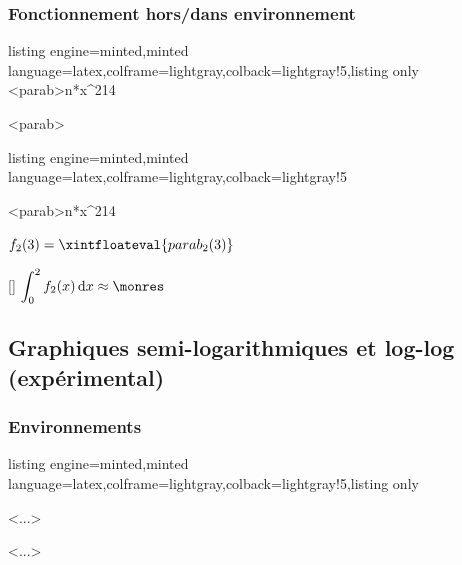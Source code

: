 \documentclass[11pt,a4paper]{ltxdoc}
\begin{document}
\subsubsection{Fonctionnement hors/dans environnement}

\begin{tcblisting}{listing engine=minted,minted language=latex,colframe=lightgray,colback=lightgray!5,listing only}
\GenererFamilleFonctions<parab>{n*x^2}{1}{4}

\TracerFamilleCourbes[clés]<parab>
\end{tcblisting}

\begin{tcblisting}{listing engine=minted,minted language=latex,colframe=lightgray,colback=lightgray!5}
\begin{GraphiqueTikz}[x=1.5cm,y=0.75cm,Xmin=-3,Xmax=3,Ymin=-1,Ymax=10]
  \DefinirFamilleCourbes[Trace,Couleurs={blue,red,green,orange},DefGlobale]%
    <parab>{n*x^2}{1}{4}
\end{GraphiqueTikz}

$f_2(3) = \xintfloateval{parab_2(3)}$

[\monres]
$\displaystyle\int_0^2 f_2(x)\,\text{d}x \approx \monres$
\end{tcblisting}

\pagebreak

\subsection{Graphiques semi-logarithmiques et log-log (expérimental)}\label{loglog}

\subsubsection{Environnements}

\begin{tcblisting}{listing engine=minted,minted language=latex,colframe=lightgray,colback=lightgray!5,listing only}
\begin{GraphiqueTikzSemiLog}[...]<...>
\end{GraphiqueTikzSemiLog}

\begin{GraphiqueTikzLogLog}[...]<...>
  \TracerAxesGrillesLogLog[clés]
\end{GraphiqueTikzLogLog}
\end{tcblisting}
\end{document}
